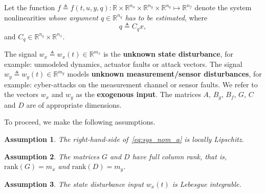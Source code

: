\documentclass[times, doublespace]{rncauth}
\newcommand{\rank}{\mathrm{rank}}
\newtheorem{assumption}{Assumption}
\begin{document}
Let the function $f\triangleq f(t,u,y,q):\mathbb{R}\times\mathbb{R}^{n_u}\times \mathbb{R}^{n_y}\times\mathbb{R}^{n_q}\mapsto\mathbb{R}^{n_f}$ denote the system nonlinearities \textit{whose argument $q\in\mathbb{R}^{n_q}$ has to be estimated}, where $$q \triangleq C_q x,$$ and $C_q\in\mathbb{R}^{n_q}\times\mathbb{R}^{n_x}$. 

The signal $w_x\triangleq w_x(t)\in\mathbb{R}^{m_x}$ is the \textbf{unknown state disturbance}, for example: unmodeled dynamics, actuator faults or attack vectors. The signal $w_y\triangleq w_y(t)\in\mathbb{R}^{m_y}$ models \textbf{unknown measurement/sensor disturbances}, for example: cyber-attacks on the measurement channel or sensor faults. We refer to the vectors $w_x$ and $w_y$ as the \textbf{exogenous input}. The matrices $A$, $B_g$, $B_f$, $G$, $C$ and $D$ are of appropriate dimensions. 

To proceed, we make the following assumptions.
\begin{assumption}\label{ass:local_lipz}
The right-hand-side of~\eqref{eq:sys_nom_a} is locally Lipschitz. 
\end{assumption}
\begin{assumption}\label{asmp:ranks}
The matrices $G$ and $D$ have full column rank, that is, $\rank(G)=m_x$ and $\rank(D)=m_y$. 
\end{assumption}
\begin{assumption}\label{asmp:faults_bdd}
The state disturbance input $w_x(t)$ is Lebesgue integrable.
\end{assumption}
\end{document}
